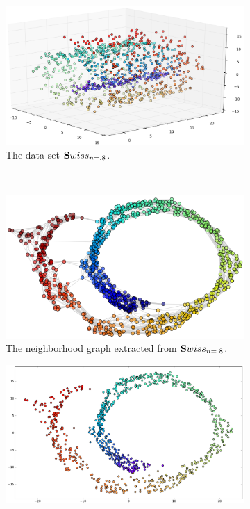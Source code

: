 \begin{description}
	\begin{figure}[H]
		\centering
		\begin{subfigure}{.45\linewidth}
			\centering
			\includegraphics[width=\linewidth]{img/noise/sr/1}
			\captionsetup{justification=centering}
			\caption{The data set $\mathbf{S}wiss_{n=.8}$.}
		\end{subfigure}~
		\begin{subfigure}{.40\linewidth}
			\centering
			\includegraphics[width=\linewidth]{img/noise/sr/3}
			\captionsetup{justification=centering}
			\caption{The neighborhood graph extracted from $\mathbf{S}wiss_{n=.8}$.}
			\label{fig:noise_3}
		\end{subfigure}
		\newline\newline\newline
		\begin{subfigure}{.45\linewidth}
			\centering
			\includegraphics[width=\linewidth]{img/noise/sr/2}

\end{subfigure}
\end{figure}
\end{description}
